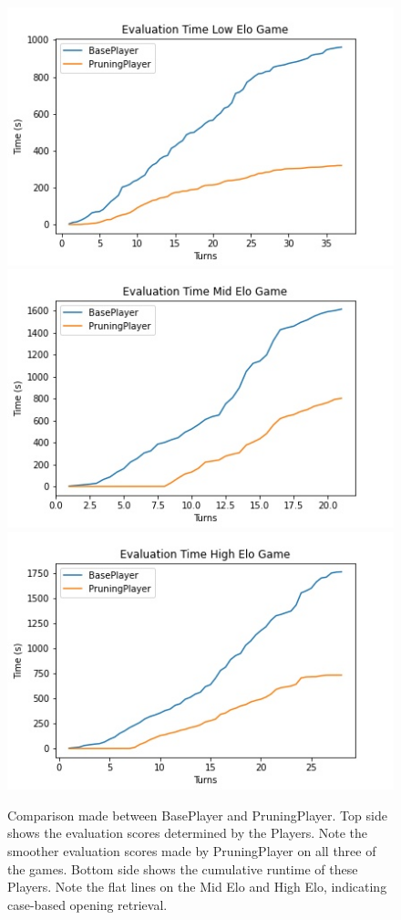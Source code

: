 \documentclass[letterpaper]{article}
\begin{document}
\begin{figure}
    \includegraphics[scale= 0.38]{low_game_time.jpg}
    \includegraphics[scale= 0.38]{mid_game_time.jpg}
    \includegraphics[scale= 0.38]{high_game_time.jpg}
  
    \caption{Comparison made between BasePlayer and PruningPlayer. Top side shows the evaluation scores determined by the Players. Note the smoother evaluation scores made by PruningPlayer on all three of the games. Bottom side shows the cumulative runtime of these Players. Note the flat lines on the Mid Elo and High Elo, indicating case-based opening retrieval.} 
    \label{score_timeEval}
\end{figure}
\end{document}
